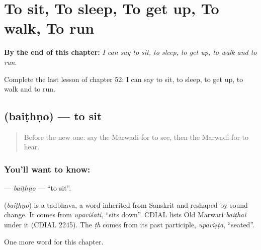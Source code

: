 
\chapter{To sit, To sleep, To get up, To walk, To run}
\label{ch:mw-to-sit-to-sleep-to-get-up-to-walk-to-run}

\begin{chapteropening}
\textbf{By the end of this chapter:} \emph{I can say to sit, to sleep, to get up, to walk and to run.}

Complete the last lesson of chapter 52: I can say to sit, to sleep, to get up, to walk and to run.
\end{chapteropening}

\section[\texorpdfstring{\mw{बैठणो} (baiṭhṇo)}{बैठणो (baiṭhṇo)}]{ (baiṭhṇo) — to sit}

\label{lesson:MW-C52-baithno}



\begin{quote}
Before the new one: say the Marwadi for to see, then the Marwadi for to hear.
\end{quote}

\subsection*{You'll want to know: }
\textbf{} — \emph{baiṭhṇo} — \textquotedblleft{}to sit\textquotedblright{}.

\begin{cousinweb}
\textbf{} (\emph{baiṭhṇo}) is a tadbhava, a word inherited from Sanskrit and reshaped by sound change. It comes from \emph{upaviśati}, \textquotedblleft{}sits down\textquotedblright{}. CDIAL lists Old Marwari \emph{baiṭhaï} under it (CDIAL 2245). The \emph{ṭh} comes from its past participle, \emph{upaviṣṭa}, \textquotedblleft{}seated\textquotedblright{}.
\end{cousinweb}

\begin{grammarlens}[title={What you've built}]
One more word for this chapter.
\end{grammarlens}

